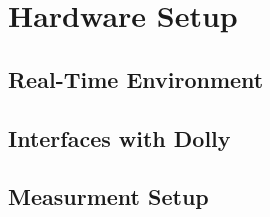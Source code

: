 \documentclass[ExampleMasters.tex]{subfiles}
\begin{document}
\chapter{Hardware Setup}


\section{Real-Time Environment}

\section{Interfaces with Dolly}

\section{Measurment Setup}
\end{document}
